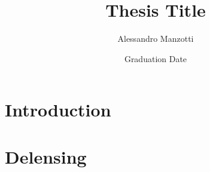 \documentclass{ucetd}
\title{Thesis Title}
\author{Alessandro Manzotti}
\date{Graduation Date}
\begin{document}
\maketitle

\makecopyright


\tableofcontents
\listoffigures
\listoftables

\acknowledgments

\abstract

\mainmatter

\chapter{Introduction}

\chapter{Delensing }


\makebibliography
% 
%
%
\end{document}
